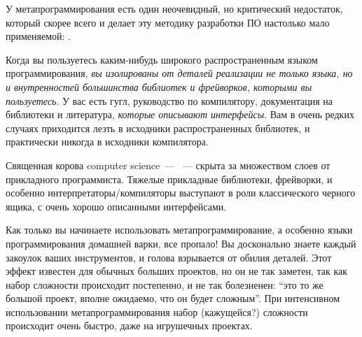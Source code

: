 \label{whitebox}

У метапрограммирования есть один неочевидный, но критический недостаток, который
скорее всего и делает эту методику разработки ПО настолько мало применяемой: .

Когда вы пользуетесь каким-нибудь широкого распространенным языком
программирования, \emph{вы изолированы от деталей реализации не только языка, но
и внутренностей большинства библиотек и фрейворков, которыми вы пользуетесь}. У
вас есть гугл, руководство по компилятору, документация на библиотеки и
литература, \textit{которые описывают интерфейсы}. Вам в очень редких случаях
приходится лезть в исходники распространенных библиотек, и практически никогда в
исходники компилятора.

\bigskip
Священная корова computer science\ --- \ ---
скрыта за множеством слоев от прикладного программиста. Тяжелые прикладные
библиотеки, фрейворки, и особенно интерпретаторы/компиляторы выступают в роли
классического черного ящика, с очень хорошо описанными интерфейсами.

\bigskip
Как только вы начинаете использовать метапрограммирование, а особенно языки
программирования домашней варки, все пропало! Вы досконально знаете каждый
закоулок ваших инструментов, и голова взрывается от обилия деталей. Этот эффект
известен для обычных больших проектов, но он не так заметен, так как набор
сложности происходит постепенно, и не так болезненен: ``это то же большой
проект, вполне ожидаемо, что он будет сложным''. При интенсивном использовании
метапрограммирования набор (кажущейся?) сложности происходит очень быстро, даже
на игрушечных проектах.
